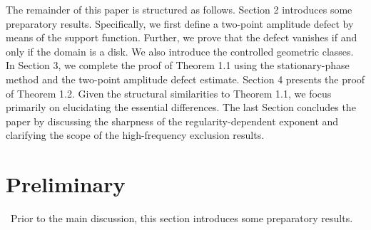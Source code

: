 \documentclass[12pt]{article}
\numberwithin{equation}{section}
\numberwithin{equation}{section}
\begin{document}
The remainder of this paper is structured as follows. Section 2 introduces some preparatory results.
Specifically, we first define a two-point amplitude defect by means of the support function.
Further, we prove that the defect vanishes if and only if the domain is a disk.
We also introduce the controlled geometric classes.
In Section 3, we complete the proof of Theorem 1.1 using the stationary-phase method and the two-point amplitude defect estimate.
Section 4 presents the proof of Theorem 1.2. Given the structural similarities to Theorem 1.1, we focus primarily on elucidating the essential differences.
The last Section concludes the paper by discussing the sharpness of the regularity-dependent exponent and clarifying the scope of the high-frequency exclusion results.

\section{Preliminary}
\bigskip
\quad\, Prior to the main discussion, this section introduces some preparatory results.
\end{document}
